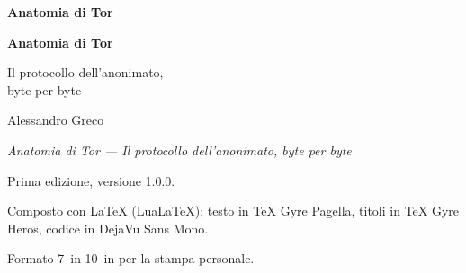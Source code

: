 \documentclass[11pt,openright,twoside]{book}
\begin{document}
\frontmatter

\thispagestyle{empty}
\null\vfill
\begin{center}
  {\LARGE\bfseries Anatomia di Tor\par}
\end{center}
\vfill\vfill
\cleardoublepage   %

\thispagestyle{empty}
\begin{center}
  \vspace*{2.5cm}
  {\Huge\bfseries Anatomia di Tor\par}
  \vspace{0.9cm}
  {\Large Il protocollo dell'anonimato,\\[0.2em]byte per byte\par}
  \vspace{3.5cm}
  {\Large Alessandro Greco\par}
  \vfill
\end{center}
\clearpage   %

\thispagestyle{empty}
\null\vfill
{\footnotesize
\noindent \textit{Anatomia di Tor --- Il protocollo dell'anonimato, byte per byte}\par
\smallskip
\noindent Prima edizione, versione 1.0.0.\par
\medskip
\DirittiLicenza
\medskip
\DirittiMarchi
\bigskip
\noindent Composto con \LaTeX{} (LuaLaTeX); testo in TeX Gyre Pagella,
titoli in TeX Gyre Heros, codice in DejaVu Sans Mono.\par
\smallskip
\noindent Formato \SI{7}{in} \texttimes{} \SI{10}{in} per la stampa personale.\par
}
\cleardoublepage   %

\tableofcontents



\mainmatter


\backmatter
\printbibliography[heading=bibintoc,title={Bibliografia}]
\printindex
\end{document}
